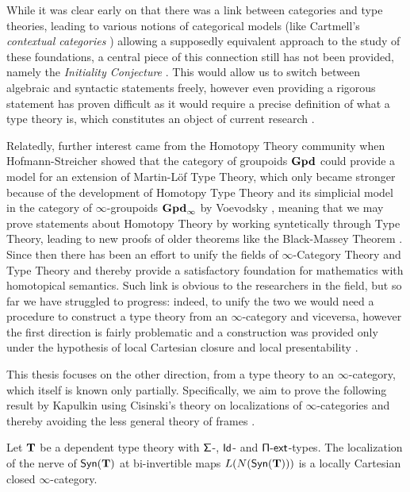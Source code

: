 \noindent
While it was clear early on that there was a link between categories and type
theories, leading to various notions of categorical models (like
Cartmell's \emph{contextual categories} \cite{Car78}) allowing a supposedly
equivalent approach to the study of these foundations, a central piece of this
connection still has not been provided, namely the \emph{Initiality Conjecture}
\cite{Str91}.
This would allow us to switch between algebraic and syntactic statements freely,
however even providing a rigorous statement has proven difficult as it would
require a precise definition of what a type theory is, which constitutes an
object of current research \cite{BHL20}.

\noindent
Relatedly, further interest came from the Homotopy Theory community when
Hofmann-Streicher \cite{HS98} showed that the category of groupoids $\operatorname{\mathbf{Gpd}}$ could
provide a model for an extension of Martin-L{\"o}f Type Theory, which only
became stronger because of the development of Homotopy Type Theory and its
simplicial model in the category of $\infty$-groupoids $\operatorname{\mathbf{Gpd}_\infty}$ by
Voevodsky \cite{KL12}, meaning that we may prove statements about Homotopy
Theory by working syntetically through Type Theory, leading to new proofs of
older theorems like the Black-Massey Theorem \cite{HFLL16}. Since then there has
been an effort to unify the
fields of $\infty$-Category Theory and Type Theory and thereby provide a
satisfactory foundation for mathematics with homotopical semantics. Such link is
obvious to the researchers in the field, but so far we have struggled to
progress: indeed, to unify the two we would need a procedure to construct a type
theory from an $\infty$-category and viceversa, however the first direction is
fairly problematic and a construction was provided only under the hypothesis of
local Cartesian closure and local presentability \cite{Shu14}.

\noindent
This thesis focuses on the other direction, from a type theory to an
$\infty$-category, which itself is known only partially. Specifically, we aim to
prove the following result by Kapulkin \cite[Thm.\ 9.3.17]{Kap14} using
Cisinski's theory on localizations of $\infty$-categories \cite{Cis19} and
thereby avoiding the less general theory of frames \cite{Szu14,KS15}.

\begin{finalthm}
  Let $\operatorname{\mathbf{T}}$ be a dependent type theory with $\operatorname{\mathsf{\Sigma}}$-, $\operatorname{\mathsf{Id}}$- and
  $\operatorname{\mathsf{\Pi-ext}}$-types. The localization of the nerve of $\mathsf{Syn}(\mathbf{T})$ at bi-invertible
  maps $L(N(\mathsf{Syn}(\mathbf{T})))$ is a locally Cartesian closed $\infty$-category.
\end{finalthm}

